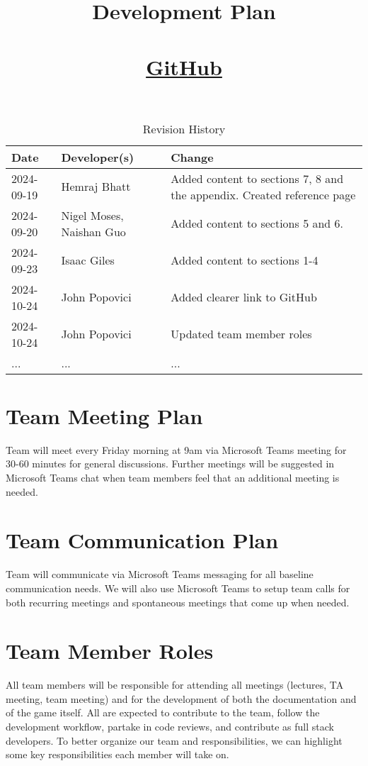 \documentclass{article}
\title{Development Plan\\\progname\\\href{https://github.com/John-Popovici/duel-of-the-eights.git}{GitHub}}
\author{\authname}
\date{}
\begin{document}
\maketitle

\begin{table}[hp]
\caption{Revision History} \label{TblRevisionHistory}
\begin{tabularx}{\textwidth}{llX}
\toprule
\textbf{Date} & \textbf{Developer(s)} & \textbf{Change}\\
\midrule
2024-09-19 & Hemraj Bhatt & Added content to sections 7, 8 and the appendix. Created reference page\\
2024-09-20 & Nigel Moses, Naishan Guo & Added content to sections 5 and 6.\\
2024-09-23 & Isaac Giles & Added content to sections 1-4\\
2024-10-24 & John Popovici & Added clearer link to GitHub\\
2024-10-24 & John Popovici & Updated team member roles\\
... & ... & ...\\
\bottomrule
\end{tabularx}
\end{table}

\newpage
\section{Team Meeting Plan}

Team will meet every Friday morning at 9am via Microsoft Teams meeting for 30-60 minutes for general discussions. Further meetings will be suggested in Microsoft Teams chat when team members feel that an additional meeting is needed.

\section{Team Communication Plan}

Team will communicate via Microsoft Teams messaging for all baseline communication needs. We will also use Microsoft Teams to setup team calls for both recurring meetings and spontaneous meetings that come up when needed.

\section{Team Member Roles}

All team members will be responsible for attending all meetings (lectures, TA meeting, team meeting) and for the development of both the documentation and of the game itself. All are expected to contribute to the team, follow the development workflow, partake in code reviews, and contribute as full stack developers. To better organize our team and responsibilities, we can highlight some key responsibilities each member will take on.
\end{document}
